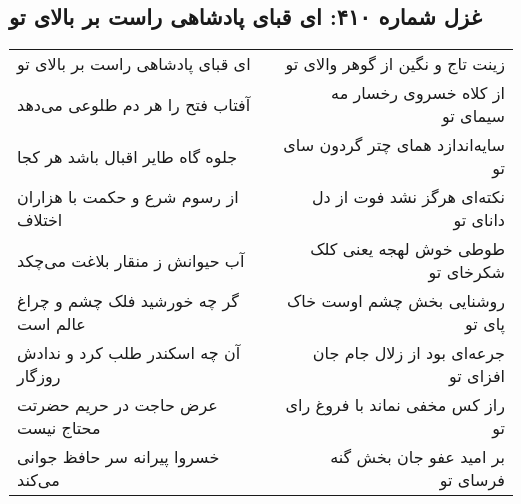 \begin{center}
\section*{غزل شماره ۴۱۰: ای قبای پادشاهی راست بر بالای تو}
\label{sec:sh410}
\begin{longtable}{l p{0.5cm} r}
ای قبای پادشاهی راست بر بالای تو
&&
زینت تاج و نگین از گوهر والای تو
\\
آفتاب فتح را هر دم طلوعی می‌دهد
&&
از کلاه خسروی رخسار مه سیمای تو
\\
جلوه گاه طایر اقبال باشد هر کجا
&&
سایه‌اندازد همای چتر گردون سای تو
\\
از رسوم شرع و حکمت با هزاران اختلاف
&&
نکته‌ای هرگز نشد فوت از دل دانای تو
\\
آب حیوانش ز منقار بلاغت می‌چکد
&&
طوطی خوش لهجه یعنی کلک شکرخای تو
\\
گر چه خورشید فلک چشم و چراغ عالم است
&&
روشنایی بخش چشم اوست خاک پای تو
\\
آن چه اسکندر طلب کرد و ندادش روزگار
&&
جرعه‌ای بود از زلال جام جان افزای تو
\\
عرض حاجت در حریم حضرتت محتاج نیست
&&
راز کس مخفی نماند با فروغ رای تو
\\
خسروا پیرانه سر حافظ جوانی می‌کند
&&
بر امید عفو جان بخش گنه فرسای تو
\\
\end{longtable}
\end{center}
